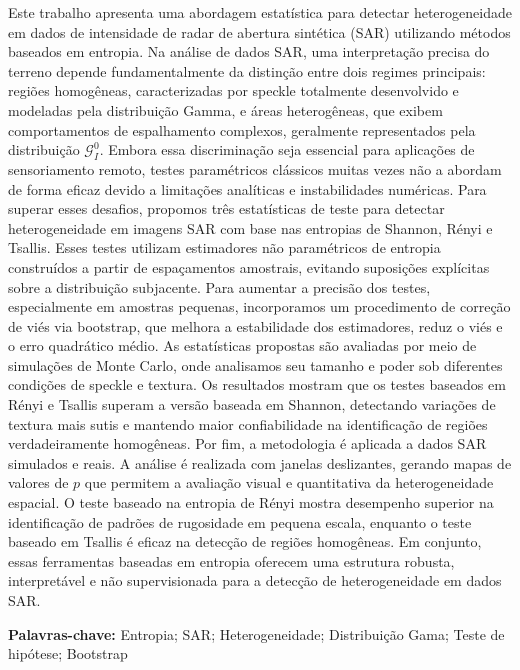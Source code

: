 

Este trabalho apresenta uma abordagem estatística para detectar heterogeneidade em dados de 
intensidade de radar de abertura sintética (SAR) utilizando métodos baseados em entropia. 
Na análise de dados SAR, uma interpretação precisa do terreno depende fundamentalmente da 
distinção entre dois regimes principais: regiões homogêneas, caracterizadas por speckle 
totalmente desenvolvido e modeladas pela distribuição Gamma, e áreas heterogêneas, que 
exibem comportamentos de espalhamento complexos, geralmente representados pela distribuição 
$\mathcal{G}_I^0$.
Embora essa discriminação seja essencial para aplicações de sensoriamento remoto, 
testes paramétricos clássicos muitas vezes não a abordam de forma eficaz devido a 
limitações analíticas e instabilidades numéricas.
Para superar esses desafios, propomos três estatísticas de teste para detectar heterogeneidade 
em imagens SAR com base nas entropias de Shannon, Rényi e Tsallis. Esses testes utilizam 
estimadores não paramétricos de entropia construídos a partir de espaçamentos amostrais, 
evitando suposições explícitas sobre a distribuição subjacente. Para aumentar a precisão dos testes, 
especialmente em amostras pequenas, incorporamos um procedimento de correção de viés via bootstrap, 
que melhora a estabilidade dos estimadores, reduz o viés e o erro quadrático médio.
As estatísticas propostas são avaliadas por meio de simulações de Monte Carlo, 
onde analisamos seu tamanho e poder sob diferentes condições de speckle e textura. 
Os resultados mostram que os testes baseados em Rényi e Tsallis superam a versão baseada 
em Shannon, detectando variações de textura mais sutis e mantendo maior confiabilidade na 
identificação de regiões verdadeiramente homogêneas.
Por fim, a metodologia é aplicada a dados SAR simulados e reais. 
A análise é realizada com janelas deslizantes, gerando mapas de valores de $p$ que permitem a 
avaliação visual e quantitativa da heterogeneidade espacial. O teste baseado na entropia de 
Rényi mostra desempenho superior na identificação de padrões de rugosidade em pequena escala, 
enquanto o teste baseado em Tsallis é eficaz na detecção de regiões homogêneas. Em conjunto, 
essas ferramentas baseadas em entropia oferecem uma estrutura robusta, interpretável e não 
supervisionada para a detecção de heterogeneidade em dados SAR.

\vspace{1em}
\par
\noindent \textbf{Palavras-chave:} Entropia; SAR; Heterogeneidade; Distribuição Gama; Teste de hipótese; Bootstrap